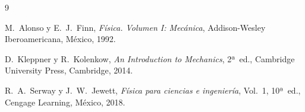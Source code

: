 \documentclass[11pt, letterpaper]{article}
\begin{document}
    \begin{thebibliography}{9}
        
        M.~Alonso y E.~J.~Finn,
        \textit{Física. Volumen I: Mecánica},
        Addison-Wesley Iberoamericana, México, 1992.
        
        D.~Kleppner y R.~Kolenkow,
        \textit{An Introduction to Mechanics},
        2ª~ed., Cambridge University Press, Cambridge, 2014.
        
        R.~A.~Serway y J.~W.~Jewett,
        \textit{Física para ciencias e ingeniería},
        Vol.~1, 10ª~ed., Cengage Learning, México, 2018.
        
    \end{thebibliography}
    
\end{document}
